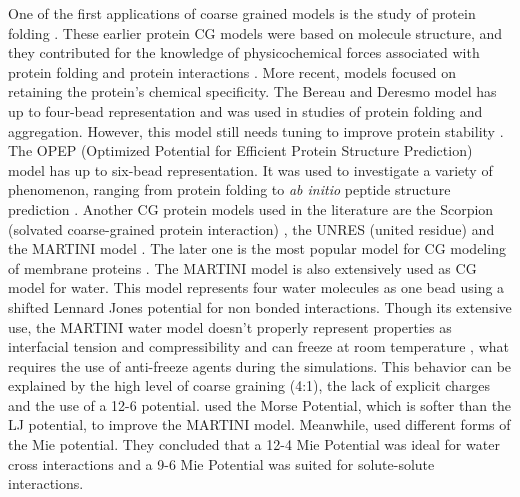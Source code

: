 One of the first applications of coarse grained models is the study of protein folding \cite{levitt1975,levitt1976}. These earlier protein CG models were based on molecule structure, and they contributed for the knowledge of physicochemical forces associated with protein folding and protein interactions \cite{koga2001}.  More recent, models focused on retaining the protein's chemical specificity. The Bereau and Deresmo model \cite{bereau2009} has up to four-bead representation and was used in studies of protein folding and aggregation. However, this model still needs tuning to improve protein stability \cite{bereau2010}. The OPEP (Optimized Potential for Efficient Protein Structure Prediction) model \cite{opep2014,opep2015} has up to six-bead representation. It was used to investigate a variety of phenomenon, ranging from protein folding to \textit{ab initio} peptide structure prediction \cite{opep2011,opep2009,opep20092}. Another CG protein models used in the literature are the Scorpion (solvated coarse-grained protein interaction)  \cite{scorpion2013}, the UNRES (united residue) \cite{unres2014} and the MARTINI model \cite{martini2013}. The later one is the most popular model for CG modeling of membrane proteins \cite{martini20132}. The MARTINI model is also extensively used as CG model for water. This model represents four water molecules as one bead using a shifted Lennard Jones potential for non bonded interactions. Though its extensive use, the MARTINI water model doesn't properly represent properties as interfacial tension and compressibility \cite{shinoda2010} and can freeze at room temperature \cite{winger2009,martini2007}, what requires the use of anti-freeze agents during the simulations. This behavior can be explained by the high level of coarse graining (4:1), the lack of explicit charges and the use of a 12-6 potential.  used the Morse Potential, which is softer than the LJ potential, to improve the MARTINI model. Meanwhile,  used different forms of the Mie potential. They concluded that a 12-4 Mie Potential was ideal for water cross interactions and  a 9-6 Mie Potential was suited for solute-solute interactions. 

